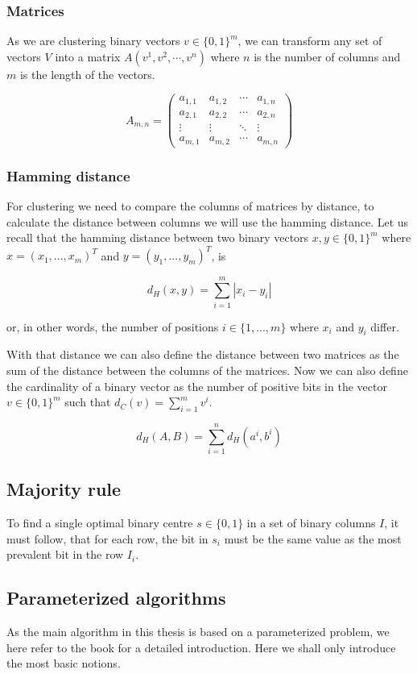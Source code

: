 \documentclass[a4paper]{article}
\begin{document}
\subsubsection{Matrices}
As we are clustering binary vectors $v \in \{0,1\}^m$, we can transform any set of vectors
$V$ into a matrix $A(v^1, v^2, \cdots, v^n)$ where $n$ is the number of columns
and $m$ is the length of the vectors.

\[
    A_{m,n} =
    \begin{pmatrix}
        a_{1,1} & a_{1,2} & \cdots & a_{1,n} \\
        a_{2,1} & a_{2,2} & \cdots & a_{2,n} \\
        \vdots  & \vdots  & \ddots & \vdots  \\
        a_{m,1} & a_{m,2} & \cdots & a_{m,n}
    \end{pmatrix}
\]

\subsubsection{Hamming distance}
For clustering we need to compare the columns of matrices by distance, to calculate the distance
between columns we will use the hamming distance. Let us recall that the hamming distance
between two binary vectors $x,y \in \{0,1\}^m$ where $x=(x_1,...,x_m)^T$ and
$y=(y_1,...,y_m)^T$, is

\[
    d_H(x,y)= \sum_{i = 1}^{m} |x_i - y_i|
\]

or, in other words, the number of positions $i \in \{1,...,m\}$ where $x_i$ and $y_i$ differ.

With that distance we can
also define the distance between two matrices as the sum of the distance between the columns of
the matrices. Now we can also define the cardinality of a binary vector as the number of positive bits in
the vector $v \in \{0,1\}^m$ such that $d_C(v)=\sum_{i = 1}^{m} v^i$.

\[
    d_H(A,B) = \sum_{i = 1}^{n} d_H(a^i, b^i)
\]

\subsection{Majority rule}
To find a single optimal binary centre $s \in \{0,1\}$ in a set of binary columns $I$, it must follow, that for each row,
the bit in $s_i$ must be the same value as the most prevalent bit in the row $I_i$.

\subsection{Parameterized algorithms}
As the main algorithm in this thesis is based on a parameterized problem, we here refer to the
book \cite{param_algo_book} for a detailed introduction. Here we shall only introduce the most
basic notions.
\end{document}
